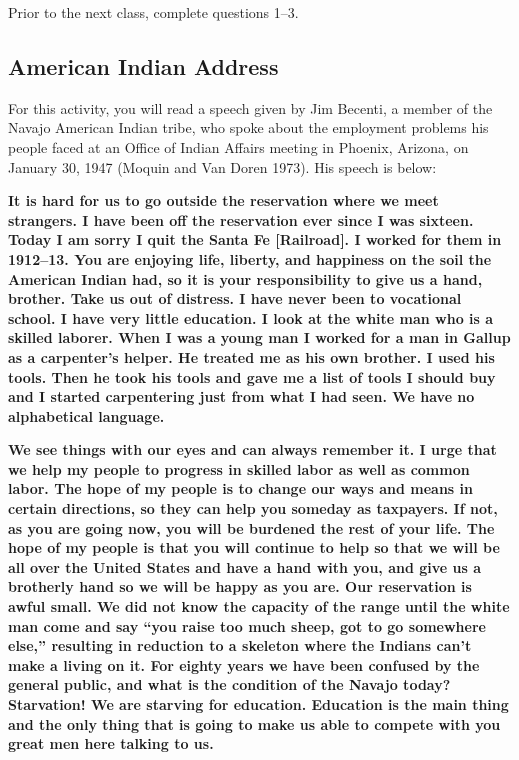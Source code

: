 \documentclass[
]{report}
\begin{document}
Prior to the next class, complete questions 1--3.

\subsection{American Indian Address}\label{american-indian-address}

For this activity, you will read a speech given by Jim Becenti, a member of the Navajo American Indian tribe, who spoke about the employment problems his people faced at an Office of Indian Affairs meeting in Phoenix, Arizona, on January 30, 1947 (Moquin and Van Doren 1973). His speech is below:

\textbf{It is hard for us to go outside the reservation where we meet strangers. I have been off the reservation ever since I was sixteen. Today I am sorry I quit the Santa Fe {[}Railroad{]}. I worked for them in 1912--13. You are enjoying life, liberty, and happiness on the soil the American Indian had, so it is your responsibility to give us a hand, brother. Take us out of distress. I have never been to vocational school. I have very little education. I look at the white man who is a skilled laborer. When I was a young man I worked for a man in Gallup as a carpenter's helper. He treated me as his own brother. I used his tools. Then he took his tools and gave me a list of tools I should buy and I started carpentering just from what I had seen. We have no alphabetical language.}

\textbf{We see things with our eyes and can always remember it. I urge that we help my people to progress in skilled labor as well as common labor. The hope of my people is to change our ways and means in certain directions, so they can help you someday as taxpayers. If not, as you are going now, you will be burdened the rest of your life. The hope of my people is that you will continue to help so that we will be all over the United States and have a hand with you, and give us a brotherly hand so we will be happy as you are. Our reservation is awful small. We did not know the capacity of the range until the white man come and say ``you raise too much sheep, got to go somewhere else,'' resulting in reduction to a skeleton where the Indians can't make a living on it. For eighty years we have been confused by the general public, and what is the condition of the Navajo today? Starvation! We are starving for education. Education is the main thing and the only thing that is going to make us able to compete with you great men here talking to us.}
\end{document}
